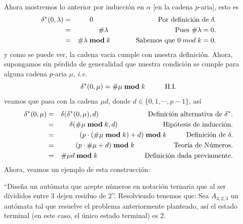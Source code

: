 \documentclass{article}
\begin{document}
\begin{enumerate}
  Ahora mostremos lo anterior por inducción en $\alpha$ [en la cadena $p$-aria],
  esto es
  \begin{eqnarray*}
    \delta^{*}(0, \lambda) &=& 0
    \hspace*{3.3cm} \text{Por definición de } \delta.\\
    &=& \#\lambda
    \hspace*{3.4cm} \text{Pues } \#\lambda = 0.\\
    &=& \#\lambda\; \mathbf{mod}\; k
    \hspace*{1.3cm} \text{Sabemos que } 0\; mod\; k = 0.
  \end{eqnarray*}
  y como se puede ver, la cadena vacia cumple con nuestra definición.
  Ahora, supongamos sin pérdida de generalidad que nuestra condición
  se cumple para alguna cadena $p$-aria $\mu$, \textit{i.e.}
  \[
  \delta^{*}(0, \mu) = \#\mu\; \mathbf{mod}\; k
  \hspace*{1cm} \text{H.I.}
  \]
  veamos que pasa con la cadena $\mu d$, donde $d \in \{0, 1, \dotsm, p - 1\}$, así
  \begin{eqnarray*}
    \delta^{*}(0, \mu) &=& \delta(\delta^{*}(0, \mu), d)
    \hspace*{2.5cm} \text{Definición alternativa de }\delta^{*}.\\
    &=& \delta(\# \mu\; \mathbf{mod}\; k, d)
    \hspace*{2.3cm} \text{Hipótesis de inducción.}\\
    &=& (p \cdot (\#\mu\; \mathbf{mod}\; k) + d)\; \mathbf{mod}\; k
    \hspace*{1cm} \text{Definición de }\delta.\\
    &=& (p \cdot \#\mu + d)\; \mathbf{mod}\; k
    \hspace*{2cm} \text{Teoría de Números.}\\
    &=& \# \mu d\; \mathbf{mod}\; k
    \hspace*{2.4cm} \text{Definición dada previamente.}
  \end{eqnarray*}
  Ahora, veamos un ejemplo de esta construcción:
  
  \hspace*{0.4cm} ``Diseña un autómata que acepte números en
  notación ternaria que al ser divididos entre $3$ dejen residuo
  de $2$''. Resolviendo tenemos que: Sea $A_{3, 2, 3}$ un autómata
  tal que resuelve el problema anteriormente planteado, así el
  estado terminal (en este caso, el único estado terminal) es $2$.
  

\end{enumerate}
\end{document}
